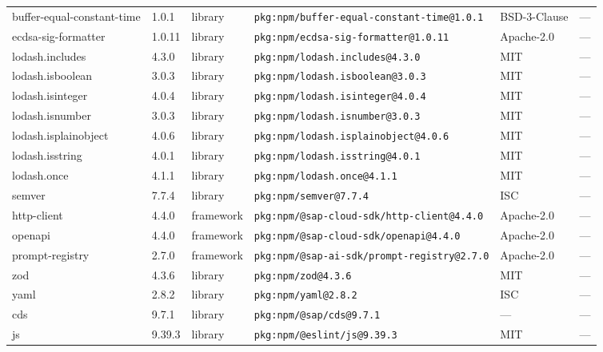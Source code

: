 \documentclass[11pt,a4paper]{article}
\begin{document}
\begin{longtable}{|p{4cm}|p{2cm}|p{1.6cm}|p{5cm}|p{1.5cm}|p{3.5cm}|}
\raggedright buffer-equal-constant-time & 1.0.1 & library & \small\texttt{pkg:npm/buffer-equal-constant-time@1.0.1} & BSD-3-Clause & \small — \\
\raggedright ecdsa-sig-formatter & 1.0.11 & library & \small\texttt{pkg:npm/ecdsa-sig-formatter@1.0.11} & Apache-2.0 & \small — \\
\raggedright lodash.includes & 4.3.0 & library & \small\texttt{pkg:npm/lodash.includes@4.3.0} & MIT & \small — \\
\raggedright lodash.isboolean & 3.0.3 & library & \small\texttt{pkg:npm/lodash.isboolean@3.0.3} & MIT & \small — \\
\raggedright lodash.isinteger & 4.0.4 & library & \small\texttt{pkg:npm/lodash.isinteger@4.0.4} & MIT & \small — \\
\raggedright lodash.isnumber & 3.0.3 & library & \small\texttt{pkg:npm/lodash.isnumber@3.0.3} & MIT & \small — \\
\raggedright lodash.isplainobject & 4.0.6 & library & \small\texttt{pkg:npm/lodash.isplainobject@4.0.6} & MIT & \small — \\
\raggedright lodash.isstring & 4.0.1 & library & \small\texttt{pkg:npm/lodash.isstring@4.0.1} & MIT & \small — \\
\raggedright lodash.once & 4.1.1 & library & \small\texttt{pkg:npm/lodash.once@4.1.1} & MIT & \small — \\
\raggedright semver & 7.7.4 & library & \small\texttt{pkg:npm/semver@7.7.4} & ISC & \small — \\
\raggedright http-client & 4.4.0 & framework & \small\texttt{pkg:npm/@sap-cloud-sdk/http-client@4.4.0} & Apache-2.0 & \small — \\
\raggedright openapi & 4.4.0 & framework & \small\texttt{pkg:npm/@sap-cloud-sdk/openapi@4.4.0} & Apache-2.0 & \small — \\
\raggedright prompt-registry & 2.7.0 & framework & \small\texttt{pkg:npm/@sap-ai-sdk/prompt-registry@2.7.0} & Apache-2.0 & \small — \\
\raggedright zod & 4.3.6 & library & \small\texttt{pkg:npm/zod@4.3.6} & MIT & \small — \\
\raggedright yaml & 2.8.2 & library & \small\texttt{pkg:npm/yaml@2.8.2} & ISC & \small — \\
\raggedright cds & 9.7.1 & library & \small\texttt{pkg:npm/@sap/cds@9.7.1} & — & \small — \\
\raggedright js & 9.39.3 & library & \small\texttt{pkg:npm/@eslint/js@9.39.3} & MIT & \small — \\

\end{longtable}
\end{document}
